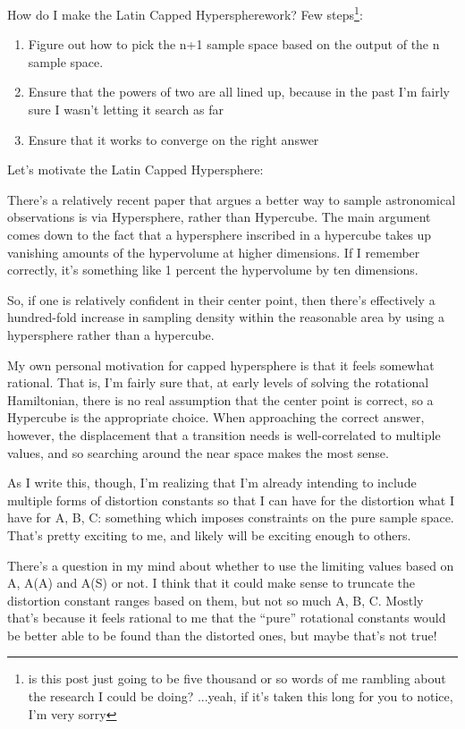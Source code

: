\documentclass[12pt]{article}
\newcommand{\say}[1]{``#1''}
\renewcommand{\,}{\textsuperscript{,}}
\begin{document}
How do I make the Latin Capped Hyperspherework?  
Few steps\footnote{is this post just going to be five thousand or so words of me rambling about the research I could be doing? ...yeah, if it's taken this long for you to notice, I'm very sorry}:

\begin{enumerate}  
\item Figure out how to pick the n+1 sample space based on the output of the n sample space.  
\item Ensure that the powers of two are all lined up, because in the past I'm fairly sure I wasn't letting it search as far  
\item Ensure that it works to converge on the right answer  
\end{enumerate}

Let's motivate the Latin Capped Hypersphere:

There's a relatively recent paper that argues a better way to sample astronomical observations is via Hypersphere, rather than Hypercube.  
The main argument comes down to the fact that a hypersphere inscribed in a hypercube takes up vanishing amounts of the hypervolume at higher dimensions.  
If I remember correctly, it's something like 1 percent the hypervolume by ten dimensions.

So, if one is relatively confident in their center point, then there's effectively a hundred-fold increase in sampling density within the reasonable area by using a hypersphere rather than a hypercube.

My own personal motivation for capped hypersphere is that it feels somewhat rational.  
That is, I'm fairly sure that, at early levels of solving the rotational Hamiltonian, there is no real assumption that the center point is correct, so a Hypercube is the appropriate choice.  
When approaching the correct answer, however, the displacement that a transition needs is well-correlated to multiple values, and so searching around the near space makes the most sense.

As I write this, though, I'm realizing that I'm already intending to include multiple forms of distortion constants so that I can have for the distortion what I have for A, B, C: something which imposes constraints on the pure sample space.  
That's pretty exciting to me, and likely will be exciting enough to others.

There's a question in my mind about whether to use the limiting values based on A, A(A) and A(S) or not.  
I think that it could make sense to truncate the distortion constant ranges based on them, but not so much A, B, C.  
Mostly that's because it feels rational to me that the \say{pure} rotational constants would be better able to be found than the distorted ones, but maybe that's not true!
\end{document}
